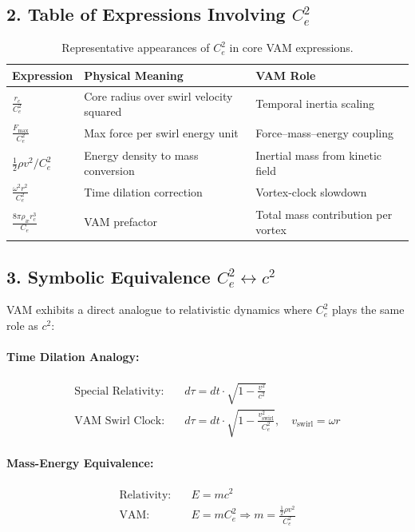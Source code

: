 \documentclass[12pt]{article}
\begin{document}
\subsection*{2. Table of Expressions Involving \( C_e^2 \)}

\begin{table}[H]
    \centering
    \renewcommand{\arraystretch}{1.3}
    \begin{tabular}{|l|l|l|}
        \hline
        \textbf{Expression} & \textbf{Physical Meaning} & \textbf{VAM Role} \\
        \hline
        $\frac{r_c}{C_e^2}$ & Core radius over swirl velocity squared & Temporal inertia scaling \\
        $\frac{F_{\text{max}}}{C_e^2}$ & Max force per swirl energy unit & Force–mass–energy coupling \\
        $\frac{1}{2} \rho v^2 / C_e^2$ & Energy density to mass conversion & Inertial mass from kinetic field \\
        $\frac{\omega^2 r^2}{C_e^2}$ & Time dilation correction & Vortex-clock slowdown \\
        $\frac{8\pi \rho_{\text{\ae}} r_c^3}{C_e}$ & VAM prefactor & Total mass contribution per vortex \\
        \hline
    \end{tabular}
    \caption{Representative appearances of \( C_e^2 \) in core VAM expressions.}
\end{table}

\subsection*{3. Symbolic Equivalence \( C_e^2 \leftrightarrow c^2 \)}

VAM exhibits a direct analogue to relativistic dynamics where \( C_e^2 \) plays the same role as \( c^2 \):

\paragraph{Time Dilation Analogy:}
\begin{align*}
    \text{Special Relativity:}\quad & d\tau = dt \cdot \sqrt{1 - \frac{v^2}{c^2}} \\
    \text{VAM Swirl Clock:}\quad & d\tau = dt \cdot \sqrt{1 - \frac{v_{\text{swirl}}^2}{C_e^2}}, \quad v_{\text{swirl}} = \omega r
\end{align*}

\paragraph{Mass-Energy Equivalence:}
\begin{align*}
    \text{Relativity:}\quad & E = mc^2 \\
    \text{VAM:}\quad & E = m C_e^2 \Rightarrow m = \frac{\frac{1}{2} \rho v^2}{C_e^2}
\end{align*}
\end{document}
